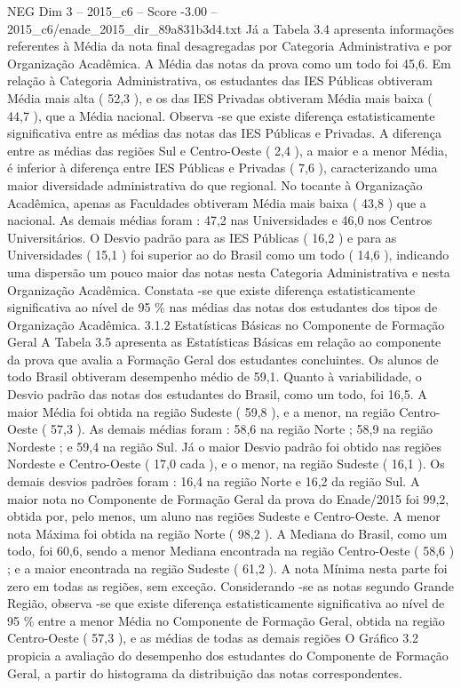 \begin{textsample}{NEG Dim 3 – 2015\_c6 – Score -3.00 – 2015\_c6/enade\_2015\_dir\_89a831b3d4.txt}
Já a Tabela 3.4 apresenta informações referentes à Média da nota final desagregadas por Categoria Administrativa e por Organização Acadêmica.
A Média das notas da prova como um todo foi 45,6.
Em relação à Categoria Administrativa, os estudantes das IES Públicas obtiveram Média mais alta ( 52,3 ), e os das IES Privadas obtiveram Média mais baixa ( 44,7 ), que a Média nacional.
Observa -se que existe diferença estatisticamente significativa entre as médias das notas das IES Públicas e Privadas.
A diferença entre as médias das regiões Sul e Centro-Oeste ( 2,4 ), a maior e a menor Média, é inferior à diferença entre IES Públicas e Privadas ( 7,6 ), caracterizando uma maior diversidade administrativa do que regional.
No tocante à Organização Acadêmica, apenas as Faculdades obtiveram Média mais baixa ( 43,8 ) que a nacional.
As demais médias foram : 47,2 nas Universidades e 46,0 nos Centros Universitários.
O Desvio padrão para as IES Públicas ( 16,2 ) e para as Universidades ( 15,1 ) foi superior ao do Brasil como um todo ( 14,6 ), indicando uma dispersão um pouco maior das notas nesta Categoria Administrativa e nesta Organização Acadêmica.
Constata -se que existe diferença estatisticamente significativa ao nível de 95 \% nas médias das notas dos estudantes dos tipos de Organização Acadêmica. 3.1.2 Estatísticas Básicas no Componente de Formação Geral A Tabela 3.5 apresenta as Estatísticas Básicas em relação ao componente da prova que avalia a Formação Geral dos estudantes concluintes.
Os alunos de todo Brasil obtiveram desempenho médio de 59,1.
Quanto à variabilidade, o Desvio padrão das notas dos estudantes do Brasil, como um todo, foi 16,5.
A maior Média foi obtida na região Sudeste ( 59,8 ), e a menor, na região Centro-Oeste ( 57,3 ).
As demais médias foram : 58,6 na região Norte ; 58,9 na região Nordeste ; e 59,4 na região Sul.
Já o maior Desvio padrão foi obtido nas regiões Nordeste e Centro-Oeste ( 17,0 cada ), e o menor, na região Sudeste ( 16,1 ).
Os demais desvios padrões foram : 16,4 na região Norte e 16,2 da região Sul.
A maior nota no Componente de Formação Geral da prova do Enade/2015 foi 99,2, obtida por, pelo menos, um aluno nas regiões Sudeste e Centro-Oeste.
A menor nota Máxima foi obtida na região Norte ( 98,2 ).
A Mediana do Brasil, como um todo, foi 60,6, sendo a menor Mediana encontrada na região Centro-Oeste ( 58,6 ) ; e a maior encontrada na região Sudeste ( 61,2 ).
A nota Mínima nesta parte foi zero em todas as regiões, sem exceção.
Considerando -se as notas segundo Grande Região, observa -se que existe diferença estatisticamente significativa ao nível de 95 \% entre a menor Média no Componente de Formação Geral, obtida na região Centro-Oeste ( 57,3 ), e as médias de todas as demais regiões O Gráfico 3.2 propicia a avaliação do desempenho dos estudantes do Componente de Formação Geral, a partir do histograma da distribuição das notas correspondentes.

\end{textsample}
